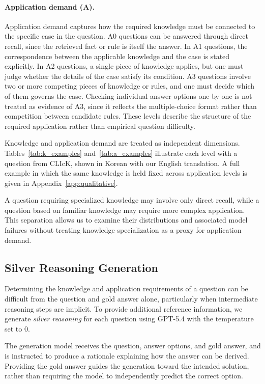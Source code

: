 \paragraph{Application demand (A).}
Application demand captures how the required knowledge must be connected to the specific case in the question.
A0 questions can be answered through direct recall, since the retrieved fact or rule is itself the answer.
In A1 questions, the correspondence between the applicable knowledge and the case is stated explicitly.
In A2 questions, a single piece of knowledge applies, but one must judge whether the details of the case satisfy its condition.
A3 questions involve two or more competing pieces of knowledge or rules, and one must decide which of them governs the case.
Checking individual answer options one by one is not treated as evidence of A3, since it reflects the multiple-choice format rather than competition between candidate rules.
These levels describe the structure of the required application rather than empirical question difficulty.

Knowledge and application demand are treated as independent dimensions.
Tables~\ref{tab:k_examples} and~\ref{tab:a_examples} illustrate each level with a question from CLIcK, shown in Korean with our English translation.
A full example in which the same knowledge is held fixed across application levels is given in Appendix~\ref{app:qualitative}.




A question requiring specialized knowledge may involve only direct recall, while a question based on familiar knowledge may require more complex application.
This separation allows us to examine their distributions and associated model failures without treating knowledge specialization as a proxy for application demand.

\subsection{Silver Reasoning Generation}
\label{app:silver}

Determining the knowledge and application requirements of a question can be difficult from the question and gold answer alone, particularly when intermediate reasoning steps are implicit.
To provide additional reference information, we generate \textit{silver reasoning} for each question using GPT-5.4 with the temperature set to 0.

The generation model receives the question, answer options, and gold answer, and is instructed to produce a rationale explaining how the answer can be derived.
Providing the gold answer guides the generation toward the intended solution, rather than requiring the model to independently predict the correct option.

